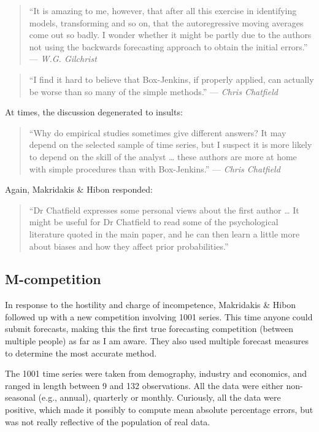 \documentclass[11pt,a4paper,]{article}
\begin{document}
\begin{quote}
``It is amazing to me, however, that after all this exercise in identifying models, transforming and so on, that the autoregressive moving averages come out so badly. I wonder whether it might be partly due to the authors not using the backwards forecasting approach to obtain the initial errors.'' --- \emph{W.G. Gilchrist}
\end{quote}

\begin{quote}
``I find it hard to believe that Box-Jenkins, if properly applied, can actually be worse than so many of the simple methods.'' --- \emph{Chris Chatfield}
\end{quote}

At times, the discussion degenerated to insults:

\begin{quote}
``Why do empirical studies sometimes give different answers? It may depend on the selected sample of time series, but I suspect it is more likely to depend on the skill of the analyst \ldots{} these authors are more at home with simple procedures than with Box-Jenkins.'' --- \emph{Chris Chatfield}
\end{quote}

Again, Makridakis \& Hibon responded:

\begin{quote}
``Dr Chatfield expresses some personal views about the first author \ldots{} It might be useful for Dr Chatfield to read some of the psychological literature quoted in the main paper, and he can then learn a little more about biases and how they affect prior probabilities.''
\end{quote}

\hypertarget{m-competition}{%
\subsection*{M-competition}\label{m-competition}}

In response to the hostility and charge of incompetence, Makridakis \& Hibon followed up with a new competition involving 1001 series. This time anyone could submit forecasts, making this the first true forecasting competition (between multiple people) as far as I am aware. They also used multiple forecast measures to determine the most accurate method.

The 1001 time series were taken from demography, industry and economics, and ranged in length between 9 and 132 observations. All the data were either non-seasonal (e.g., annual), quarterly or monthly. Curiously, all the data were positive, which made it possibly to compute mean absolute percentage errors, but was not really reflective of the population of real data.
\end{document}
